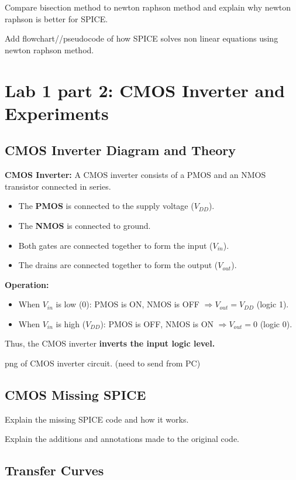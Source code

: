 \documentclass[a4paper,12pt]{article}
\begin{document}
Compare bisection method to newton raphson method and explain why newton raphson is better for SPICE.

Add flowchart//pseudocode of how SPICE solves non linear equations using newton raphson method.

\section{Lab 1 part 2: CMOS Inverter and Experiments}

\subsection{CMOS Inverter Diagram and Theory}

\textbf{CMOS Inverter:} A CMOS inverter consists of a PMOS and an NMOS transistor connected in series.

\begin{itemize}
  \item The \textbf{PMOS} is connected to the supply voltage ($V_{DD}$).
  \item The \textbf{NMOS} is connected to ground.
  \item Both gates are connected together to form the input ($V_{in}$).
  \item The drains are connected together to form the output ($V_{out}$).
\end{itemize}

\textbf{Operation:}
\begin{itemize}
  \item When $V_{in}$ is low ($0$): PMOS is ON, NMOS is OFF $\Rightarrow V_{out} = V_{DD}$ (logic 1).
  \item When $V_{in}$ is high ($V_{DD}$): PMOS is OFF, NMOS is ON $\Rightarrow V_{out} = 0$ (logic 0).
\end{itemize}

Thus, the CMOS inverter \textbf{inverts the input logic level.}

png of CMOS inverter circuit. (need to send from PC)

\subsection{CMOS Missing SPICE}

Explain the missing SPICE code and how it works.

Explain the additions and annotations made to the original code.

\subsection{Transfer Curves}
\end{document}
